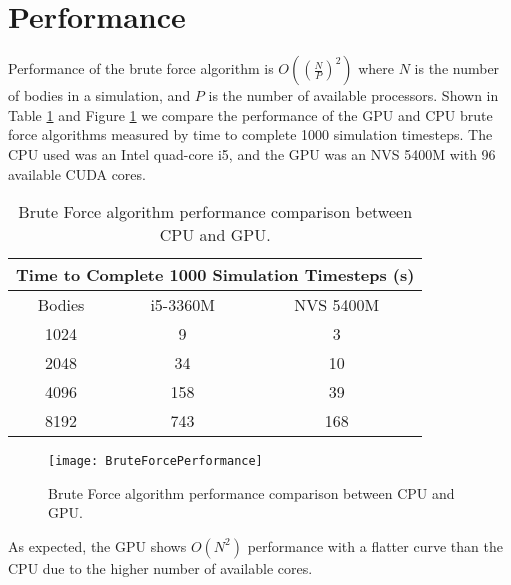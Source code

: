 \documentclass{thesis}
\begin{document}
\section{Performance}
Performance of the brute force algorithm is $O\left(\left(\frac{N}{P}\right)^2\right)$ where $N$ is the number of bodies in a simulation, and $P$ is the number of available processors. Shown in Table \ref{tab:BruteForcePerformance} and Figure \ref{fig:BruteForcePerformance} we compare the performance of the GPU and CPU brute force algorithms measured by time to complete 1000 simulation timesteps. The CPU used was an Intel quad-core i5, and the GPU was an NVS 5400M with 96 available CUDA cores.
\begin{table}
    \centering
    \label{tab:BruteForcePerformance}
    \caption{Brute Force algorithm performance comparison between CPU and GPU.}
    \begin{tabular}{|c|||c||c|}
        \hline
        \multicolumn{3}{|c|}{Time to Complete 1000 Simulation Timesteps (s)}\\
        \hline
        Bodies & i5-3360M & NVS 5400M \\
        \hline
        1024 & 9 & 3\\
        2048 & 34 & 10\\
        4096 & 158 & 39\\
        8192 & 743 & 168\\
        \hline
    \end{tabular}
\end{table}
\begin{figure}[t]
    \caption{Brute Force algorithm performance comparison between CPU and GPU.}
    \label{fig:BruteForcePerformance}
    \centering
    \texttt{[image: BruteForcePerformance]}
\end{figure}
As expected, the GPU shows $O(N^2)$ performance with a flatter curve than the CPU due to the higher number of available cores.
\end{document}
